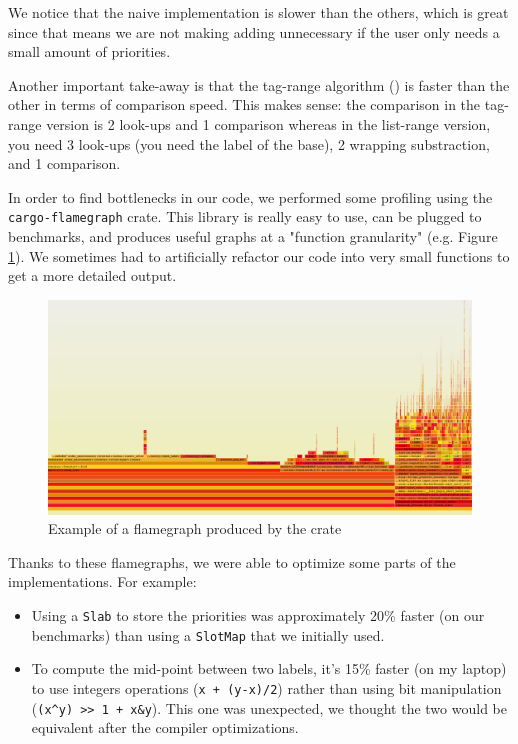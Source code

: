 \documentclass[12pt]{article}
\begin{document}
We notice that the naive implementation is slower than the others, which is great since that means we are not making adding unnecessary if the user only needs a small amount of priorities.

Another important take-away is that the tag-range algorithm (\cite{10.5555/647912.740822}) is faster than the other in terms of comparison speed. This makes sense: the comparison in the tag-range version is 2 look-ups and 1 comparison whereas in the list-range version, you need 3 look-ups (you need the label of the base), 2 wrapping substraction, and 1 comparison.

In order to find bottlenecks in our code, we performed some profiling using the \texttt{cargo-flamegraph} crate. This library is really easy to use, can be plugged to benchmarks, and produces useful graphs at a "function granularity" (e.g. Figure \ref{graph:flame}). We sometimes had to artificially refactor our code into very small functions to get a more detailed output.

\begin{figure}[h!]
    \includegraphics[width=450px, keepaspectratio]{./flamegraph.png}
    \caption{Example of a flamegraph produced by the crate}
    \label{graph:flame}
\end{figure}

Thanks to these flamegraphs, we were able to optimize some parts of the implementations. For example:
\begin{itemize}
    \item Using a \texttt{Slab} to store the priorities was approximately 20\% faster (on our benchmarks) than using a \texttt{SlotMap} that we initially used.
    \item To compute the mid-point between two labels, it's 15\% faster (on my laptop) to use integers operations (\texttt{x + (y-x)/2}) rather than using bit manipulation (\texttt{(x\textasciicircum y) >> 1 + x\&y}). This one was unexpected, we thought the two would be equivalent after the compiler optimizations.
\end{itemize}
\end{document}
